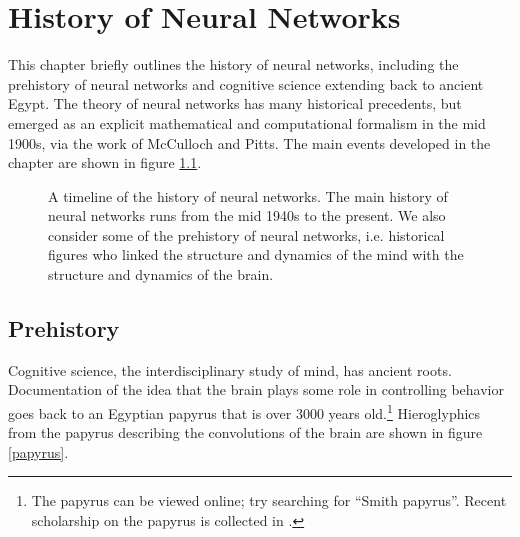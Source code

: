 \chapter{History of Neural Networks}\label{ch_history}



This chapter briefly outlines the history of neural networks, including the prehistory of neural networks and cognitive science extending back to ancient Egypt. The theory of neural networks has many historical precedents, but emerged as an explicit mathematical and computational formalism in the mid 1900s, via the work of McCulloch and Pitts. The main events developed in the chapter are shown in figure \ref{timelineHistory}. 

\begin{figure}[h]
\centering
{}
\caption[Pamela Payne and Jeff Yoshimi.]{A timeline of the history of neural networks. The main history of neural networks runs from the mid 1940s to the present. We  also consider some of the prehistory of neural networks,  i.e. historical figures who linked the structure and dynamics of the mind with the structure and dynamics of the brain.}
\label{timelineHistory}
\end{figure}

\section{Prehistory}

Cognitive science, the interdisciplinary study of mind, has ancient roots. Documentation of the idea that the brain plays some role in controlling behavior goes back to an Egyptian papyrus that is over 3000 years old.\footnote{The papyrus can be viewed online; try searching for ``Smith papyrus''. Recent scholarship on the papyrus is collected in \cite{meltzer2014edwin}.} Hieroglyphics from the papyrus describing the convolutions of the brain are shown in figure \ref{papyrus}. 

